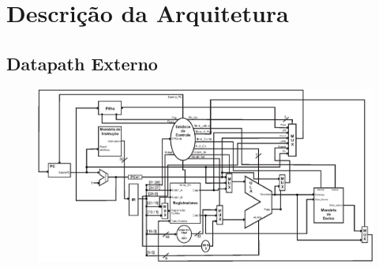 \documentclass{report}
\begin{document}
\chapter{Descrição da Arquitetura}

	
	\newpage
	
	
	\newpage
	
		
	\newpage
	
	
	\newpage
	
	\begin{landscape}
	\section{Datapath Externo}
	\begin{figure}[htpb!]
    	\includegraphics{./datapath/datapath_final-1.eps}
  	\end{figure}
  	\end{landscape}

% 
% 
\end{document}
